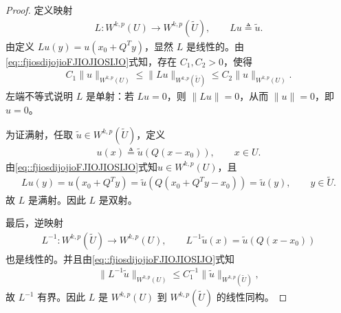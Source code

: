 \documentclass[../../main.tex]{subfiles}%
\begin{document}
\begin{proof}
定义映射
\begin{align*}
L:W^{k,p}(U)\to W^{k,p}(\widetilde U),\qquad Lu\triangleq \tilde u.
\end{align*}
由定义 $Lu(y)=u(x_0+Q^T y)$，显然 $L$ 是线性的。由\eqref{eq::fjiosdijojioFJIOJIOSIJO}式知，存在 $C_1,C_2>0$，使得
\begin{align*}
C_1\|u\|_{W^{k,p}(U)}\leqslant\|Lu\|_{W^{k,p}(\widetilde U)}\leqslant C_2\|u\|_{W^{k,p}(U)}.
\end{align*}
左端不等式说明 $L$ 是单射：若 $Lu=0$，则 $\|Lu\|=0$，从而 $\|u\|=0$，即 $u=0$。

为证满射，任取 $\tilde u\in W^{k,p}(\widetilde U)$，定义
\begin{align*}
u(x)\triangleq \tilde u(Q(x-x_0)),\qquad x\in U.
\end{align*}
由\eqref{eq::fjiosdijojioFJIOJIOSIJO}式知$u\in W^{k,p}(U)$，且
\begin{align*}
Lu(y)=u(x_0+Q^T y)=\tilde u(Q(x_0+Q^T y-x_0))=\tilde u(y),\qquad y\in\widetilde U.
\end{align*}
故 $L$ 是满射。因此 $L$ 是双射。

最后，逆映射
\begin{align*}
L^{-1}:W^{k,p}(\widetilde U)\to W^{k,p}(U),\qquad L^{-1}\tilde u(x)=\tilde u(Q(x-x_0))
\end{align*}
也是线性的。并且由\eqref{eq::fjiosdijojioFJIOJIOSIJO}式知
\begin{align*}
\|L^{-1}\tilde u\|_{W^{k,p}(U)}\leqslant C_1^{-1}\|\tilde u\|_{W^{k,p}(\widetilde U)},
\end{align*}
故 $L^{-1}$ 有界。因此 $L$ 是 $W^{k,p}(U)$ 到 $W^{k,p}(\widetilde U)$ 的线性同构。
\end{proof}
\end{document}
